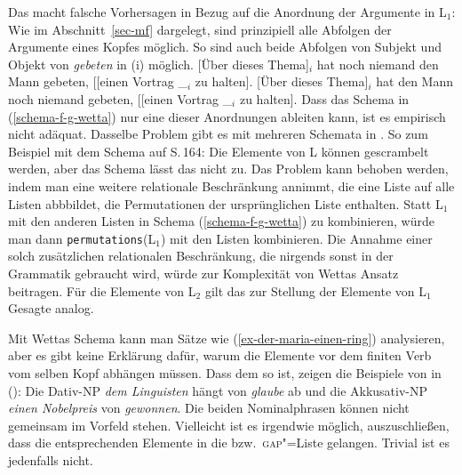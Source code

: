 \begin{exe}
\begin{xlist}
{  Das macht falsche Vorhersagen in Bezug auf die Anordnung der Argumente in L$_1$: Wie im
  Abschnitt~\ref{sec-mf} dargelegt, sind prinzipiell alle Abfolgen der Argumente eines Kopfes
  möglich. So sind auch beide Abfolgen von Subjekt und Objekt von \emph{gebeten} in (i) möglich.
\eal
\ex {}[Über dieses Thema]$_i$ hat noch niemand den Mann gebeten, [[einen Vortrag \_$_i$ zu halten].
\ex {}[Über dieses Thema]$_i$ hat den Mann noch niemand gebeten, [[einen Vortrag \_$_i$ zu halten].
\zl
  Dass das Schema in (\ref{schema-f-g-wetta}) nur eine dieser Anordnungen ableiten kann, ist es
  empirisch nicht adäquat. Dasselbe Problem gibt es mit mehreren Schemata in
  . So zum Beispiel mit dem Schema auf S.\,164: Die Elemente von L können
  gescrambelt werden, aber das Schema lässt das nicht zu. Das Problem kann behoben werden, indem man
  eine weitere relationale Beschränkung annimmt, die eine Liste auf alle Listen abbbildet, die
  Permutationen der ursprünglichen Liste enthalten. Statt L$_1$ mit den anderen Listen in Schema 
  (\ref{schema-f-g-wetta}) zu kombinieren, würde man dann \texttt{permutations}(L$_1$) mit den
  Listen kombinieren. Die Annahme einer solch zusätzlichen relationalen Beschränkung, die nirgends
  sonst in der Grammatik gebraucht wird, würde zur Komplexität von Wettas Ansatz beitragen.
}
Für die Elemente von L$_2$ gilt das zur Stellung der Elemente von L$_1$ Gesagte analog.

Mit Wettas Schema kann man Sätze wie (\ref{ex-der-maria-einen-ring}) analysieren, aber es gibt keine
Erklärung dafür, warum die Elemente vor dem finiten Verb vom selben Kopf abhängen müssen. Dass dem
so ist, zeigen die Beispiele von \citet[]{Fanselow87a} in ():
\eal
\label{ex-mult-front-same-verb}
\zl
Die Dativ-NP \emph{dem Linguisten} hängt von \emph{glaube} ab und die Akkusativ-NP \emph{einen
  Nobelpreis} von \emph{gewonnen}. Die beiden Nominalphrasen können nicht gemeinsam im Vorfeld
stehen. Vielleicht ist es irgendwie möglich, auszuschließen, dass die entsprechenden Elemente in die
\slashl bzw.\ \textsc{gap}"=Liste gelangen. Trivial ist es jedenfalls nicht. 



\end{xlist}
\end{exe}
